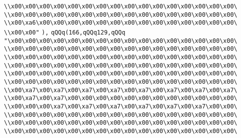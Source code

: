 \verb|\\x00\x00\x00\x00\x00\x00\x00\x00\x00\x00\x00\x00\x00\x00\x00\x00\|\newline
\verb|\\x00\x00\x00\x00\x00\x00\x00\x00\x00\x00\x00\x00\x00\x00\x00\x00\|\newline
\verb|\\x00\xa6\x00\x00\x00\x00\x00\x00\x00\x00\x00\x00\x00\x00\x00\x00\|\newline
\verb|\\x00\x00"|\newline
\verb|),|\newline
\verb|qQQq(166,qQQq129,qQQq|\newline
\verb|"\x00\x00\x00\x00\x00\x00\x00\x00\x00\x00\x00\x00\x00\x00\x00\x00\|\newline
\verb|\\x00\x00\x00\x00\x00\x00\x00\x00\x00\x00\x00\x00\x00\x00\x00\x00\|\newline
\verb|\\x00\x00\x00\x00\x00\x00\x00\x00\x00\x00\x00\x00\x00\x00\x00\x00\|\newline
\verb|\\x00\x00\x00\x00\x00\x00\x00\x00\x00\x00\x00\x00\x00\x00\x00\x00\|\newline
\verb|\\x00\x00\x00\x00\x00\x00\x00\x00\x00\x00\x00\x00\x00\x00\x00\x00\|\newline
\verb|\\x00\x00\x00\x00\x00\x00\x00\x00\x00\x00\x00\x00\x00\x00\x00\x00\|\newline
\verb|\\x00\xa7\x00\xa7\x00\xa7\x00\xa7\x00\xa7\x00\xa7\x00\xa7\x00\xa7\|\newline
\verb|\\x00\xa7\x00\xa7\x00\x00\x00\x00\x00\x00\x00\x00\x00\x00\x00\x00\|\newline
\verb|\\x00\x00\x00\xa7\x00\xa7\x00\xa7\x00\xa7\x00\xa7\x00\xa7\x00\x00\|\newline
\verb|\\x00\x00\x00\x00\x00\x00\x00\x00\x00\x00\x00\x00\x00\x00\x00\x00\|\newline
\verb|\\x00\x00\x00\x00\x00\x00\x00\x00\x00\x00\x00\x00\x00\x00\x00\x00\|\newline
\verb|\\x00\x00\x00\x00\x00\x00\x00\x00\x00\x00\x00\x00\x00\x00\x00\x00\|\newline
